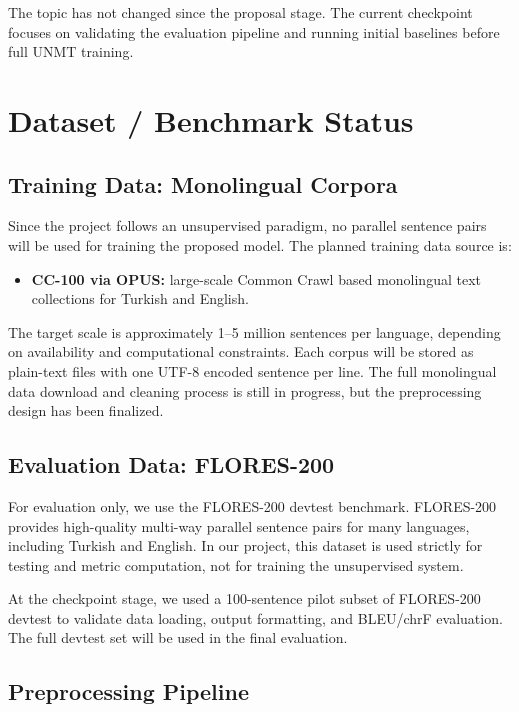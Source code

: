 \documentclass[11pt]{article}
\begin{document}
The topic has not changed since the proposal stage. The current checkpoint focuses on validating the evaluation pipeline and running initial baselines before full UNMT training.

\section{Dataset / Benchmark Status}

\subsection{Training Data: Monolingual Corpora}

Since the project follows an unsupervised paradigm, no parallel sentence pairs will be used for training the proposed model. The planned training data source is:

\begin{itemize}
    \item \textbf{CC-100 via OPUS:} large-scale Common Crawl based monolingual text collections for Turkish and English.
\end{itemize}

The target scale is approximately 1--5 million sentences per language, depending on availability and computational constraints. Each corpus will be stored as plain-text files with one UTF-8 encoded sentence per line. The full monolingual data download and cleaning process is still in progress, but the preprocessing design has been finalized.

\subsection{Evaluation Data: FLORES-200}

For evaluation only, we use the FLORES-200 devtest benchmark. FLORES-200 provides high-quality multi-way parallel sentence pairs for many languages, including Turkish and English. In our project, this dataset is used strictly for testing and metric computation, not for training the unsupervised system.

At the checkpoint stage, we used a 100-sentence pilot subset of FLORES-200 devtest to validate data loading, output formatting, and BLEU/chrF evaluation. The full devtest set will be used in the final evaluation.

\subsection{Preprocessing Pipeline}
\end{document}
